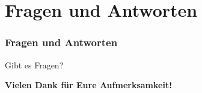 \documentclass[12pt]{beamer}
\begin{document}
\section{Fragen und Antworten}

\begin{frame}
	\frametitle{Fragen und Antworten}

	\begin{center}
		\large Gibt es Fragen?
	\end{center}
	\pause
	\centerline{\textbf{Vielen Dank für Eure Aufmerksamkeit!}}
\end{frame}
\end{document}
